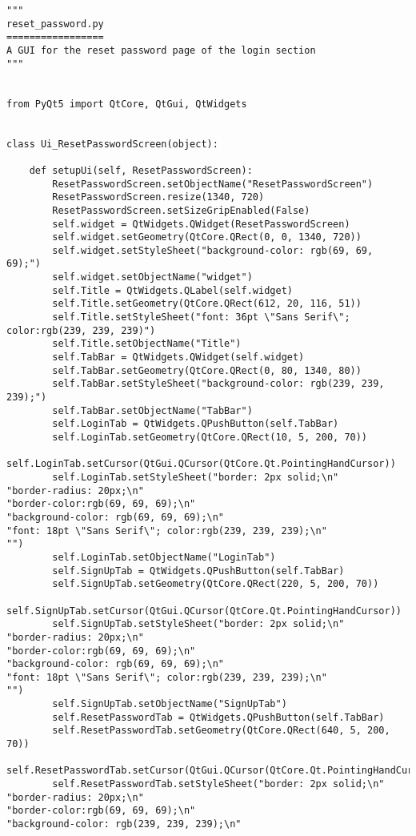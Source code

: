 \documentclass{article}
\begin{document}
\begin{lstlisting}
"""
reset_password.py
=================
A GUI for the reset password page of the login section
"""


from PyQt5 import QtCore, QtGui, QtWidgets


class Ui_ResetPasswordScreen(object):

    def setupUi(self, ResetPasswordScreen):
        ResetPasswordScreen.setObjectName("ResetPasswordScreen")
        ResetPasswordScreen.resize(1340, 720)
        ResetPasswordScreen.setSizeGripEnabled(False)
        self.widget = QtWidgets.QWidget(ResetPasswordScreen)
        self.widget.setGeometry(QtCore.QRect(0, 0, 1340, 720))
        self.widget.setStyleSheet("background-color: rgb(69, 69, 69);")
        self.widget.setObjectName("widget")
        self.Title = QtWidgets.QLabel(self.widget)
        self.Title.setGeometry(QtCore.QRect(612, 20, 116, 51))
        self.Title.setStyleSheet("font: 36pt \"Sans Serif\"; color:rgb(239, 239, 239)")
        self.Title.setObjectName("Title")
        self.TabBar = QtWidgets.QWidget(self.widget)
        self.TabBar.setGeometry(QtCore.QRect(0, 80, 1340, 80))
        self.TabBar.setStyleSheet("background-color: rgb(239, 239, 239);")
        self.TabBar.setObjectName("TabBar")
        self.LoginTab = QtWidgets.QPushButton(self.TabBar)
        self.LoginTab.setGeometry(QtCore.QRect(10, 5, 200, 70))
        self.LoginTab.setCursor(QtGui.QCursor(QtCore.Qt.PointingHandCursor))
        self.LoginTab.setStyleSheet("border: 2px solid;\n"
"border-radius: 20px;\n"
"border-color:rgb(69, 69, 69);\n"
"background-color: rgb(69, 69, 69);\n"
"font: 18pt \"Sans Serif\"; color:rgb(239, 239, 239);\n"
"")
        self.LoginTab.setObjectName("LoginTab")
        self.SignUpTab = QtWidgets.QPushButton(self.TabBar)
        self.SignUpTab.setGeometry(QtCore.QRect(220, 5, 200, 70))
        self.SignUpTab.setCursor(QtGui.QCursor(QtCore.Qt.PointingHandCursor))
        self.SignUpTab.setStyleSheet("border: 2px solid;\n"
"border-radius: 20px;\n"
"border-color:rgb(69, 69, 69);\n"
"background-color: rgb(69, 69, 69);\n"
"font: 18pt \"Sans Serif\"; color:rgb(239, 239, 239);\n"
"")
        self.SignUpTab.setObjectName("SignUpTab")
        self.ResetPasswordTab = QtWidgets.QPushButton(self.TabBar)
        self.ResetPasswordTab.setGeometry(QtCore.QRect(640, 5, 200, 70))
        self.ResetPasswordTab.setCursor(QtGui.QCursor(QtCore.Qt.PointingHandCursor))
        self.ResetPasswordTab.setStyleSheet("border: 2px solid;\n"
"border-radius: 20px;\n"
"border-color:rgb(69, 69, 69);\n"
"background-color: rgb(239, 239, 239);\n"

\end{lstlisting}
\end{document}
